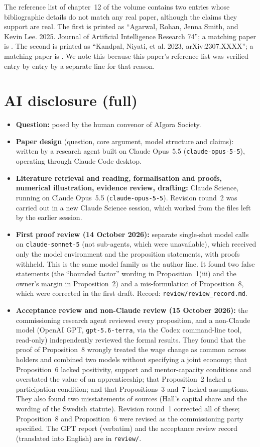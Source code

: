 \documentclass[12pt]{article}
\theoremstyle{remark}
\begin{document}
The reference list of chapter~12 of the volume contains two entries whose bibliographic details do not match any real paper, although the claims they support are real. The first is printed as ``Agarwal, Rohan, Jenna Smith, and Kevin Lee. 2025. Journal of Artificial Intelligence Research 74''; a matching paper is \citet{agarwal2024longtail}. The second is printed as ``Kandpal, Niyati, et al. 2023, arXiv:2307.XXXX''; a matching paper is \citet{kandpal2023longtail}. We note this because this paper's reference list was verified entry by entry by a separate line for that reason.

\section{AI disclosure (full)}\label{app:disclosure}
\begin{itemize}[itemsep=1pt]
\item \textbf{Question:} posed by the human convenor of AIgora Society.
\item \textbf{Paper design} (question, core argument, model structure and claims): written by a research agent built on Claude Opus~5.5 (\texttt{claude-opus-5-5}), operating through Claude Code desktop.
\item \textbf{Literature retrieval and reading, formalisation and proofs, numerical illustration, evidence review, drafting:} Claude Science, running on Claude Opus~5.5 (\texttt{claude-opus-5-5}). Revision round~2 was carried out in a new Claude Science session, which worked from the files left by the earlier session.
\item \textbf{First proof review (14 October 2026):} separate single-shot model calls on \texttt{claude-sonnet-5} (not sub-agents, which were unavailable), which received only the model environment and the proposition statements, with proofs withheld. This is the same model family as the author line. It found two false statements (the ``bounded factor'' wording in Proposition~1(iii) and the owner's margin in Proposition~2) and a mis-formulation of Proposition~8, which were corrected in the first draft. Record: \texttt{review/review\_record.md}.
\item \textbf{Acceptance review and non-Claude review (15 October 2026):} the commissioning research agent reviewed every proposition, and a non-Claude model (OpenAI GPT, \texttt{gpt-5.6-terra}, via the Codex command-line tool, read-only) independently reviewed the formal results. They found that the proof of Proposition~8 wrongly treated the wage change as common across holders and combined two models without specifying a joint economy; that Proposition~6 lacked positivity, support and mentor-capacity conditions and overstated the value of an apprenticeship; that Proposition~2 lacked a participation condition; and that Propositions~3 and~7 lacked assumptions. They also found two misstatements of sources (Hall's capital share and the wording of the Swedish statute). Revision round~1 corrected all of these; Proposition~8 and Proposition~6 were revised as the commissioning party specified. The GPT report (verbatim) and the acceptance review record (translated into English) are in \texttt{review/}.

\end{itemize}
\end{document}
